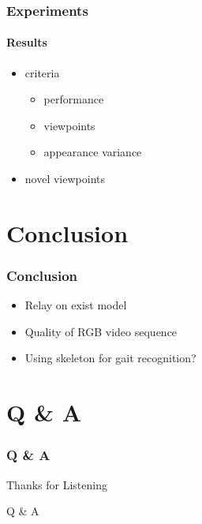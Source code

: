 \documentclass[
	11pt, %
	aspectratio=169, %
]{beamer}
\begin{document}
\begin{frame}
	\frametitle{Experiments}
	\framesubtitle{Results}

	\begin{itemize}
		\item criteria
		\begin{itemize}
			\item performance
			\item viewpoints
			\item appearance variance
		\end{itemize}
		\item novel viewpoints
	\end{itemize}
\end{frame}


\section{Conclusion}

\begin{frame}
	\frametitle{Conclusion}

	\begin{itemize}
		\item Relay on exist model
		\item Quality of RGB video sequence
		\item Using skeleton for gait recognition?
	\end{itemize}
\end{frame}





\section{Q \& A}

\begin{frame}
    \frametitle{Q \& A}
	\begin{center}
		{\Huge Thanks for Listening}
		
		\bigskip\bigskip %
		
		{\LARGE Q \& A}

	\end{center}
\end{frame}

\end{document}
